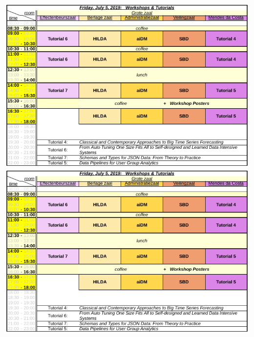 \ifodd\value{page}
\includegraphics[angle=270,width=\textwidth]{schedule/p6.pdf}%
\else
\includegraphics[angle=90,width=\textwidth]{schedule/p6.pdf}%
\fi






